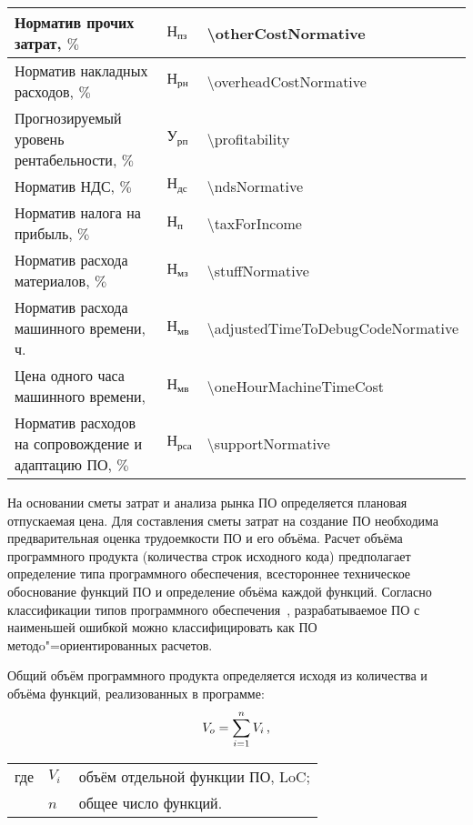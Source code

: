 \begin{table}[!ht]
\begin{tabular}{| >{\raggedright}m{} 
                  | >{\centering}m{} 
                  | >{\centering\arraybackslash}m{}|}
    \hline
    Норматив прочих затрат, $\%$ & $ \text{Н}_\text{пз} $ & \num{\otherCostNormative} \\

    \hline
    Норматив накладных расходов, $\%$ & $ \text{Н}_\text{рн} $ & \num{\overheadCostNormative} \\

    \hline
    Прогнозируемый уровень рентабельности, $\%$ & $ \text{У}_\text{рп} $ & \num{\profitability} \\

    \hline
    Норматив НДС, $\%$ & $ \text{Н}_\text{дс} $ & \num{\ndsNormative} \\

    \hline
    Норматив налога на прибыль, $\%$ & $ \text{Н}_\text{п} $ & \num{\taxForIncome} \\

    \hline
    Норматив расхода материалов, $\%$ & $ \text{Н}_\text{мз} $ & \num{\stuffNormative} \\

    \hline
    Норматив расхода машинного времени, ч. & $ \text{Н}_\text{мв} $ & \num{\adjustedTimeToDebugCodeNormative} \\

    \hline
    Цена одного часа машинного времени, \byr{} & $ \text{Н}_\text{мв} $ & \num{\oneHourMachineTimeCost} \\

    \hline
    Норматив расходов на сопровождение и адаптацию ПО, $\%$ & $ \text{Н}_\text{рса} $ & \num{\supportNormative} \\
    \hline
  \end{tabular}
\end{table}

На основании сметы затрат и анализа рынка ПО определяется плановая отпускаемая цена.
Для составления сметы затрат на создание ПО необходима предварительная оценка трудоемкости ПО и его объёма.
Расчет объёма программного продукта (количества строк исходного кода) предполагает определение типа программного обеспечения, всестороннее техническое обоснование функций ПО и определение объёма каждой функций.
Согласно классификации типов программного обеспечения~\cite[с.~59,~приложение 1]{palicyn_2006}, разрабатываемое ПО с наименьшей ошибкой можно классифицировать как ПО методo"=ориентированных расчетов.


Общий объём программного продукта определяется исходя из количества и объёма функций, реализованных в программе:
\begin{equation}
  \label{eq:econ:total_program_size}
  V_{o} = \sum_{i = 1}^{n} V_{i} \text{\,,}
\end{equation}
\par
\begin{tabular}{@{}ll@{ --- }p{}}
где & $ V_{i} $ & объём отдельной функции ПО, LoC; \\
    & $ n $~ & общее число функций. \\[\parsep]
\end{tabular}


